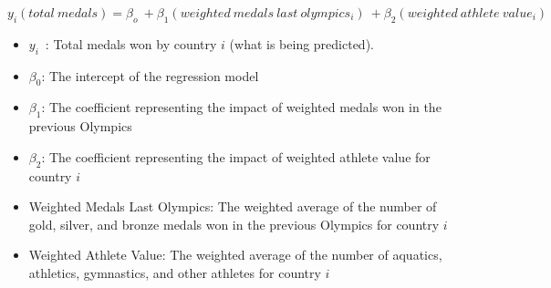 \documentclass{mcmthesis}
\begin{document}
\begin{equation}
y_i(total\ medals) = \beta_o \ + \beta_1 (weighted\ medals\ last\ olympics_i) \ + \beta_2(weighted\ athlete\ value_i)
\end{equation} 

\begin{itemize}
    \item $y_i$\ : Total medals won by country $i$ (what is being predicted).
    \item $\beta_0$: The intercept of the regression model
    \item $\beta_1$: The coefficient representing the impact
    of weighted medals won in the previous Olympics
    \item $\beta_2$: The coefficient representing the impact
    of weighted athlete value for country $i$
    \item Weighted Medals Last Olympics: The weighted average of the number of gold, silver, and bronze medals won in the previous Olympics for country $i$
    \item Weighted Athlete Value: The weighted average of the number of aquatics, athletics, gymnastics, and other athletes for country $i$
\end{itemize}
\end{document}
